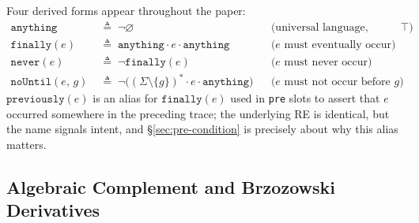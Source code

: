 \documentclass[acmsmall,screen]{acmart}
\newcommand{\anything}{\mathtt{anything}}
\newcommand{\finally}[1]{\mathtt{finally}(#1)}
\newcommand{\previously}[1]{\mathtt{previously}(#1)}
\newcommand{\never}[1]{\mathtt{never}(#1)}
\newcommand{\noUntil}[2]{\mathtt{noUntil}(#1,\,#2)}
\begin{document}
Four derived forms appear throughout the paper:
\begin{align*}
  \anything &\;\triangleq\; \neg\varnothing
            &&\text{(universal language, written $\top$)} \\
  \finally{e} &\;\triangleq\; \anything \cdot e \cdot \anything
            &&\text{($e$ must eventually occur)} \\
  \never{e} &\;\triangleq\; \neg\finally{e}
            &&\text{($e$ must never occur)} \\
  \noUntil{e}{g} &\;\triangleq\;
            \neg\bigl((\Sigma\setminus\{g\})^* \cdot e \cdot \anything\bigr)
            &&\text{($e$ must not occur before $g$)}
\end{align*}
\noindent
$\previously{e}$ is an alias for $\finally{e}$ used in \lstinline{pre} slots
to assert that $e$ occurred somewhere in the preceding trace; the underlying
RE is identical, but the name signals intent, and \S\ref{sec:pre-condition}
is precisely about why this alias matters.

\subsection{Algebraic Complement and Brzozowski Derivatives}
\label{sec:deriv}
\end{document}
